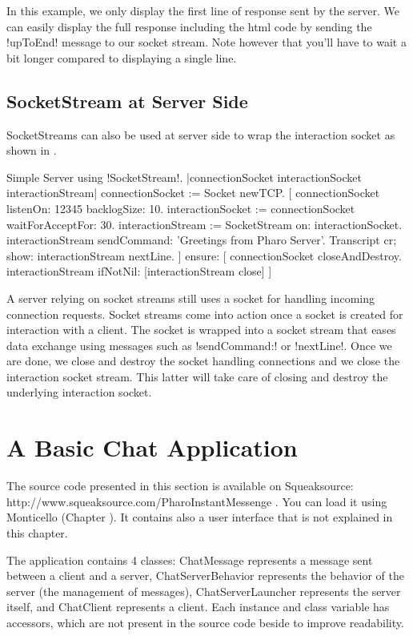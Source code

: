 \documentclass[a4paper,10pt,twoside]{book}
\begin{document}
In this example, we only display the first line of response sent by the server.
We can easily display the full response including the html code by sending the \ct!upToEnd! message to our socket stream.
Note however that you'll have to wait a bit longer compared to displaying a single line.

\subsection{SocketStream at Server Side}
SocketStreams can also be used at server side to wrap the interaction socket as shown in .

\begin{script}{Simple Server using \ct!SocketStream!.}
|connectionSocket interactionSocket interactionStream|
connectionSocket := Socket newTCP. 
[
	connectionSocket listenOn: 12345 backlogSize: 10. 
	interactionSocket := connectionSocket waitForAcceptFor: 30. 
	interactionStream := SocketStream on: interactionSocket.
	interactionStream sendCommand: 'Greetings from Pharo Server'.
	Transcript cr; show: interactionStream nextLine.
] ensure: [
	connectionSocket closeAndDestroy.
	interactionStream ifNotNil: [interactionStream close]
]
\end{script}

A server relying on socket streams still uses a socket for handling incoming connection requests.
Socket streams come into action once a socket is created for interaction with a client.
The socket is wrapped into a socket stream that eases data exchange using messages such as \ct!sendCommand:! or \ct!nextLine!.
Once we are done, we close and destroy the socket handling connections and we close the interaction socket stream.
This latter will take care of closing and destroy the underlying interaction socket.


\section{A Basic Chat Application}

The source code presented in this section is available on Squeaksource: http://www.squeaksource.com/PharoInstantMessenge . You can load it using Monticello (Chapter ). It contains also a user interface that is not explained in this chapter.

The application contains 4 classes: ChatMessage represents a message sent between a client and a server, ChatServerBehavior represents the behavior of the server (\eg the management of messages), ChatServerLauncher represents the server itself, and ChatClient represents a client. Each instance and class variable has accessors, which are not present in the source code beside to improve readability.
\end{document}
